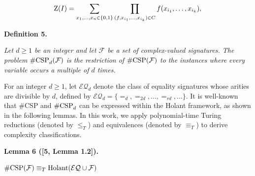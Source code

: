 \documentclass[10pt,a4paper]{article}
\begin{document}
\[\begin{gathered}
\text{Z}(I)=\sum_{\begin{subarray}{c}x_{1},\ldots,x_{n}\in\{0,1\}\end{subarray}}\prod_{(f,x_{i_{1}},\ldots,x_{i_{k}})\in C}f(x_{i_{1}},\ldots,x_{i_{k}}),
\end{gathered}\]







\par\medskip\noindent\textbf{
\textbf{Definition 5}\textbf{.}
}\par



\emph{Let $d\geq 1$ be an integer and let $\mathcal{F}$ be a set of complex-valued signatures. The problem $\textup{{\#CSP}}_{d}(\mathcal{F})$ is the restriction of $\textup{{\#CSP}}(\mathcal{F})$ to the instances where every variable occurs a multiple of $d$ times.}\par






For an integer $d\geq 1$, let $\mathcal{EQ}_{d}$ denote the class of equality signatures whose arities are divisible by $d$, defined by $\mathcal{EQ}_{d}=\{=_{d},=_{2d},\ldots,=_{rd},\ldots\}$. It is well-known that \#CSP and $\textup{{\#CSP}}_{d}$ can be expressed within the Holant framework, as shown in the following lemmas. In this work, we apply polynomial-time Turing reductions (denoted by $\leq_{T}$) and equivalences (denoted by $\equiv_{T}$) to derive complexity classifications.\par





\par\medskip\noindent\textbf{
\textbf{Lemma 6}\textbf{ }([5, Lemma 1.2])\textbf{.}
}\par



$\#\textup{{CSP}}(\mathcal{F})\equiv_{T}\textup{{Holant}}(\mathcal{EQ}\cup\mathcal{F})$\emph{}\par





\end{document}
